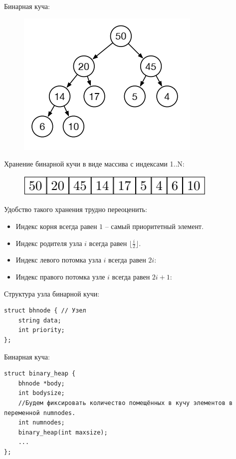 \documentclass{beamer}
\begin{document}
\begin{frame}
	Бинарная куча:
	\begin{figure}[h]
		\centering
		\includegraphics[scale=0.5]{images/lec06-pic03.png}
	\end{figure}		
	Хранение бинарной кучи в виде массива с индексами 1..N:
	\begin{figure}[h]
		\centering
		\includegraphics[scale=0.5]{images/lec06-pic04.png}
	\end{figure}
	Удобство такого хранения трудно переоценить:
	\begin{itemize}
		\item Индекс корня всегда равен $1$ -- самый приоритетный элемент.
		\item Индекс родителя узла $i$ всегда равен $\lfloor \frac{i}{2}\rfloor$.
		\item Индекс левого потомка узла $i$ всегда равен $2i$:
		\item Индекс правого потомка узле $i$ всегда равен $2i+1$:
	\end{itemize}
\end{frame}

\begin{frame}[fragile, t]
	Структура узла бинарной кучи:
	\begin{verbatim}
struct bhnode { // Узел
	string data;
	int priority;
};	
	\end{verbatim}
	
	Бинарная куча:
	\begin{verbatim}
struct binary_heap { 
	bhnode *body;
	int bodysize;
	//Будем фиксировать количество помещённых в кучу элементов в переменной numnodes. 	
	int numnodes;
	binary_heap(int maxsize);
	...
};	
	\end{verbatim}
\end{frame}
\end{document}
